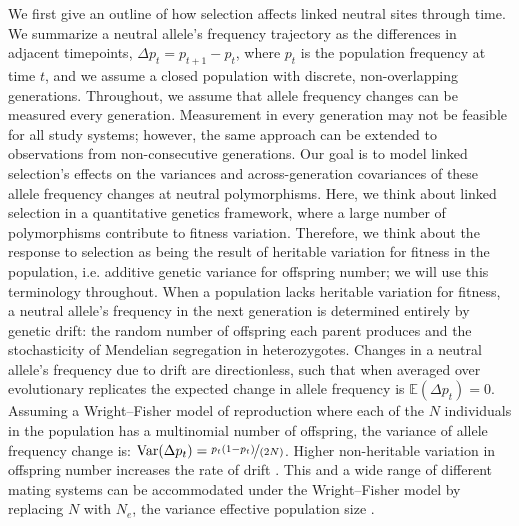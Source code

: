 \documentclass[11pt]{article}
\newcommand{\E}{\mathbb{E}}
\DeclareMathOperator{\var}{Var}
\begin{document}
We first give an outline of how selection affects linked neutral sites through
time. We summarize a neutral allele's frequency trajectory as the differences
in adjacent timepoints, $\Delta p_t = p_{t+1} - p_t$, where $p_t$ is the
population frequency at time $t$, and we assume a closed population with
discrete, non-overlapping generations. Throughout, we assume that allele
frequency changes can be measured every generation. Measurement in every
generation may not be feasible for all study systems; however, the same
approach can be extended to observations from non-consecutive generations. Our
goal is to model linked selection's effects on the variances and
across-generation covariances of these allele frequency changes at neutral
polymorphisms. Here, we think about linked selection in a quantitative genetics
framework, where a large number of polymorphisms contribute to fitness
variation. Therefore, we think about the response to selection as being the
result of heritable variation for fitness in the population, i.e. additive
genetic variance for offspring number; we will use this terminology throughout.
When a population lacks heritable variation for fitness, a neutral allele's
frequency in the next generation is determined entirely by genetic drift: the
random number of offspring each parent produces and the stochasticity of
Mendelian segregation in heterozygotes. Changes in a neutral allele's frequency
due to drift are directionless, such that when averaged over evolutionary
replicates the expected change in allele frequency is $\E(\Delta p_t) = 0$.
Assuming a Wright--Fisher model of reproduction where each of the $N$
individuals in the population has a multinomial number of offspring, the
variance of allele frequency change is: $\var(\Delta p_t) =
\nicefrac{p_t(1-p_t)}{(2N)}$. Higher non-heritable variation in offspring
number increases the rate of drift \parencite{Wright1938-tv}. This and a wide
range of different mating systems can be accommodated under the Wright--Fisher
model by replacing $N$ with $N_e$, the variance effective population size
\parencite{Crow1970-wm,Charlesworth2009-sg}. 
\end{document}
